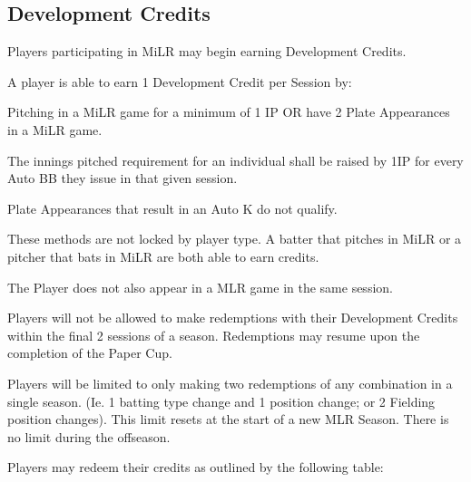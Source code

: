 \subsection{Development Credits}
\label{sec:Development Credits}
\begin{deepEnumerate}
    \item Players participating in MiLR may begin earning Development Credits.
    \item A player is able to earn 1 Development Credit per Session by:
    \begin{deepEnumerate}
        \item Pitching in a MiLR game for a minimum of 1 IP {OR} have 2 Plate Appearances in a MiLR game. 
        \begin{deepEnumerate}
            \item The innings pitched requirement for an individual shall be raised by 1IP for every Auto BB they issue in that given session.
            \item Plate Appearances that result in an Auto K do not qualify.
            \item These methods are not locked by player type. A batter that pitches in MiLR or a pitcher that bats in MiLR are both able to earn credits.
        \end{deepEnumerate}
        \item The Player {does not} also appear in a MLR game in the same session.
    \end{deepEnumerate}
    \item Players will {not} be allowed to make redemptions with their Development Credits within the final 2 sessions of a season. Redemptions may resume upon the completion of the Paper Cup.
    \item Players will be limited to only making {two} redemptions of any combination in a single season. (Ie. 1 batting type change and 1 position change; or 2 Fielding position changes). This limit resets at the start of a new MLR Season. There is no limit during the offseason.
    \item Players may redeem their credits as outlined by the following table:
\end{deepEnumerate}

